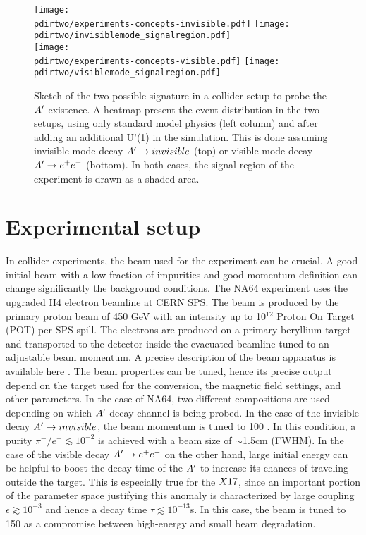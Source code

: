\begin{figure}[bth!]
  \centering
  \texttt{[image: \\pdirtwo/experiments-concepts-invisible.pdf]}
  \texttt{[image: \\pdirtwo/invisiblemode\_signalregion.pdf]} \\
  \texttt{[image: \\pdirtwo/experiments-concepts-visible.pdf]}
  \texttt{[image: \\pdirtwo/visiblemode\_signalregion.pdf]}   
\caption[Sketch of experimental signatures for $\DM$]{Sketch of the two possible signature in a collider setup to probe the $\DM$ existence. A heatmap present the event distribution in the two setups, using only standard model physics (left column) and after adding an additional U'(1) in the simulation. This is done assuming invisible mode decay $A'\to invisible$ (top) or visible mode decay $A' \to e^+e^-$ (bottom). In both cases, the signal region of the experiment is drawn as a shaded area.}
\label{fig:two-signature}
\end{figure}

\clearpage
\newpage

\section{Experimental setup}
\label{ch2:sec:experimental-setup}

In collider experiments, the beam used for the experiment can be crucial. A good initial beam with a low fraction of impurities and good momentum definition can change significantly the background conditions. The NA64 experiment uses the upgraded H4 electron beamline at CERN SPS. The beam is produced by the primary proton beam of 450 \si{\giga\electronvolt} with an intensity up to 10$^{12}$ Proton On Target (POT) per SPS spill. The electrons are produced on a primary beryllium target and transported to the detector inside the evacuated beamline tuned to an adjustable beam momentum. A precise description of the beam apparatus is available here \cite{sps-beamline,h4-beamline}. The beam properties can be tuned, hence its precise output depend on the target used for the conversion, the magnetic field settings, and other parameters. In the case of NA64, two different compositions are used depending on which $\DM$ decay channel is being probed. In the case of the invisible decay $A'\to invisible$, the beam momentum is tuned to 100 \gev. In this condition, a purity $\pi^-/e^- \lesssim 10^{-2}$ is achieved with a beam size of $\sim$1.5\si{cm} (FWHM). In the case of the visible decay $A' \to e^+e^-$ on the other hand, large initial energy can be helpful to boost the decay time of the $\DM$ to increase its chances of traveling outside the target. This is especially true for the $X17$, since an important portion of the parameter space justifying this anomaly is characterized by large coupling $\epsilon \gtrsim 10^{-3}$ and hence a decay time $\tau \lesssim 10^{-13}$\si{s}. In this case, the beam is tuned to 150 \gev as a compromise between high-energy and small beam degradation.


